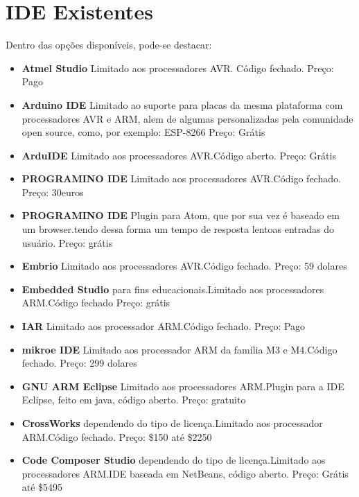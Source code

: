 \section{IDE Existentes}
Dentro das opções disponíveis, pode-se destacar:
\begin{itemize}
 \item \textbf{Atmel Studio}
 \subitem Limitado aos processadores AVR. Código fechado.
 \subitem Preço: Pago

 \item \textbf{Arduino IDE}
 \subitem Limitado ao suporte para placas da mesma plataforma com processadores AVR e ARM, alem de algumas personalizadas
 pela comunidade open source, como, por exemplo: ESP-8266
 \subitem Preço: Grátis

 \item \textbf{ArduIDE}
 \subitem Limitado aos processadores AVR.Código aberto.
 \subitem Preço: Grátis

 \item \textbf{PROGRAMINO IDE}
 \subitem Limitado aos processadores AVR.Código fechado.
 \subitem Preço: 30euros

 \item \textbf{PROGRAMINO IDE}
 \subitem Plugin para Atom, que por sua vez é baseado em um browser.tendo dessa forma um tempo de resposta lentoas entradas do usuário.
 \subitem Preço: grátis

 \item \textbf{Embrio}
 \subitem Limitado aos processadores AVR.Código fechado.
 \subitem Preço: 59 dolares

 \item \textbf{Embedded Studio}
 \subitem para fins educacionais.Limitado aos processadores ARM.Código fechado
 \subitem Preço: grátis

 \item \textbf{IAR}
 \subitem Limitado aos processador ARM.Código fechado.
 \subitem Preço: Pago

 \item \textbf{mikroe IDE}
 \subitem Limitado aos processador ARM da família M3 e M4.Código fechado.
 \subitem Preço: 299 dolares

 \item \textbf{GNU ARM Eclipse}
 \subitem Limitado aos processadores ARM.Plugin para a IDE Eclipse, feito em java, código aberto.
 \subitem Preço: gratuito

 \item \textbf{CrossWorks}
 \subitem dependendo do tipo de licença.Limitado aos processador ARM.Código fechado.
 \subitem Preço: \$150 até \$2250

 \item \textbf{Code Composer Studio}
 \subitem dependendo do tipo de licença.Limitado aos processadores ARM.IDE baseada em NetBeans, código aberto.
 \subitem Preço: Grátis até \$5495

\end{itemize}

